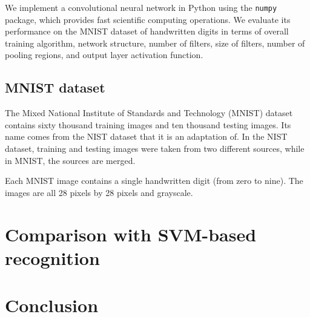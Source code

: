 \documentclass[10pt,twocolumn]{article}
\begin{document}
We implement a convolutional neural network in Python using the \texttt{numpy} package, which provides fast scientific computing operations. We evaluate its performance on the MNIST dataset of handwritten digits in terms of overall training algorithm, network structure, number of filters, size of filters, number of pooling regions, and output layer activation function.

\subsection{MNIST dataset}

The Mixed National Institute of Standards and Technology (MNIST) dataset contains sixty thousand training images and ten thousand testing images. Its name comes from the NIST dataset that it is an adaptation of. In the NIST dataset, training and testing images were taken from two different sources, while in MNIST, the sources are merged.

Each MNIST image contains a single handwritten digit (from zero to nine). The images are all 28 pixels by 28 pixels and grayscale.

\section{Comparison with SVM-based recognition} \label{sec:evalfeature}

\section{Conclusion}

\end{document}
